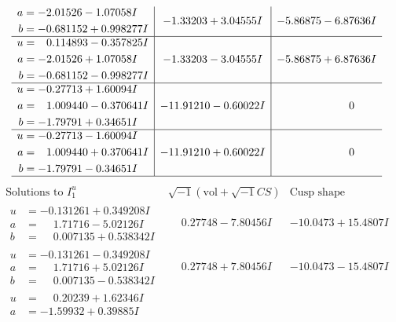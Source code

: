\documentclass[1p]{elsarticle_modified}
\theoremstyle{definition}
\newcommand{\I}{\sqrt{-1}}
\begin{document}
$$\begin{array}{c|c|c}
\begin{aligned}
a &= -2.01526 - 1.07058 I \\
b &= -0.681152 + 0.998277 I\end{aligned}
 & -1.33203 + 3.04555 I & -5.86875 - 6.87636 I \\ \hline\begin{aligned}
u &= \phantom{-}0.114893 - 0.357825 I \\
a &= -2.01526 + 1.07058 I \\
b &= -0.681152 - 0.998277 I\end{aligned}
 & -1.33203 - 3.04555 I & -5.86875 + 6.87636 I \\ \hline\begin{aligned}
u &= -0.27713 + 1.60094 I \\
a &= \phantom{-}1.009440 - 0.370641 I \\
b &= -1.79791 + 0.34651 I\end{aligned}
 & -11.91210 - 0.60022 I & \phantom{-0.000000 } 0 \\ \hline\begin{aligned}
u &= -0.27713 - 1.60094 I \\
a &= \phantom{-}1.009440 + 0.370641 I \\
b &= -1.79791 - 0.34651 I\end{aligned}
 & -11.91210 + 0.60022 I & \phantom{-0.000000 } 0\\
 \hline 
 \end{array}$$\newpage$$\begin{array}{c|c|c}  
\text{Solutions to }I^u_{1}& \I (\text{vol} + \sqrt{-1}CS) & \text{Cusp shape}\\
 \hline 
\begin{aligned}
u &= -0.131261 + 0.349208 I \\
a &= \phantom{-}1.71716 - 5.02126 I \\
b &= \phantom{-}0.007135 + 0.538342 I\end{aligned}
 & \phantom{-}0.27748 - 7.80456 I & -10.0473 + 15.4807 I \\ \hline\begin{aligned}
u &= -0.131261 - 0.349208 I \\
a &= \phantom{-}1.71716 + 5.02126 I \\
b &= \phantom{-}0.007135 - 0.538342 I\end{aligned}
 & \phantom{-}0.27748 + 7.80456 I & -10.0473 - 15.4807 I \\ \hline\begin{aligned}
u &= \phantom{-}0.20239 + 1.62346 I \\
a &= -1.59932 + 0.39885 I \\

\end{aligned}
\end{array}$$
\end{document}
